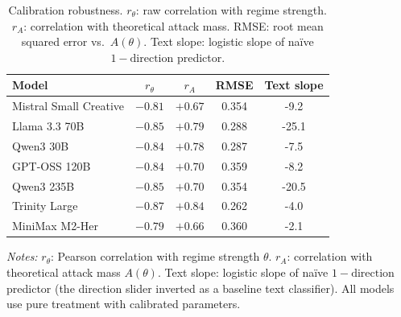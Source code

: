 \begin{table}[htbp]
\centering
\caption{Calibration robustness. $r_\theta$: raw correlation with regime strength. $r_A$: correlation with theoretical attack mass. RMSE: root mean squared error vs.\ $A(\theta)$. Text slope: logistic slope of na\"ive $1 - \text{direction}$ predictor.}
\label{tab:calibration_robustness}
\footnotesize
\setlength{\tabcolsep}{4pt}
\begin{tabular}{lcccc}
\toprule
Model & $r_\theta$ & $r_A$ & RMSE & Text slope \\
\midrule
Mistral Small Creative & $-0.81$ & $+0.67$ & 0.354 & -9.2 \\
Llama 3.3 70B & $-0.85$ & $+0.79$ & 0.288 & -25.1 \\
Qwen3 30B & $-0.84$ & $+0.78$ & 0.287 & -7.5 \\
GPT-OSS 120B & $-0.84$ & $+0.70$ & 0.359 & -8.2 \\
Qwen3 235B & $-0.85$ & $+0.70$ & 0.354 & -20.5 \\
Trinity Large & $-0.87$ & $+0.84$ & 0.262 & -4.0 \\
MiniMax M2-Her & $-0.79$ & $+0.66$ & 0.360 & -2.1 \\
\bottomrule
\end{tabular}
\vspace{0.25em}
\parbox{\columnwidth}{\footnotesize\emph{Notes:} $r_\theta$: Pearson correlation with regime strength $\theta$. $r_A$: correlation with theoretical attack mass $A(\theta)$. Text slope: logistic slope of na\"ive $1 - \text{direction}$ predictor (the direction slider inverted as a baseline text classifier). All models use pure treatment with calibrated parameters.}
\end{table}
